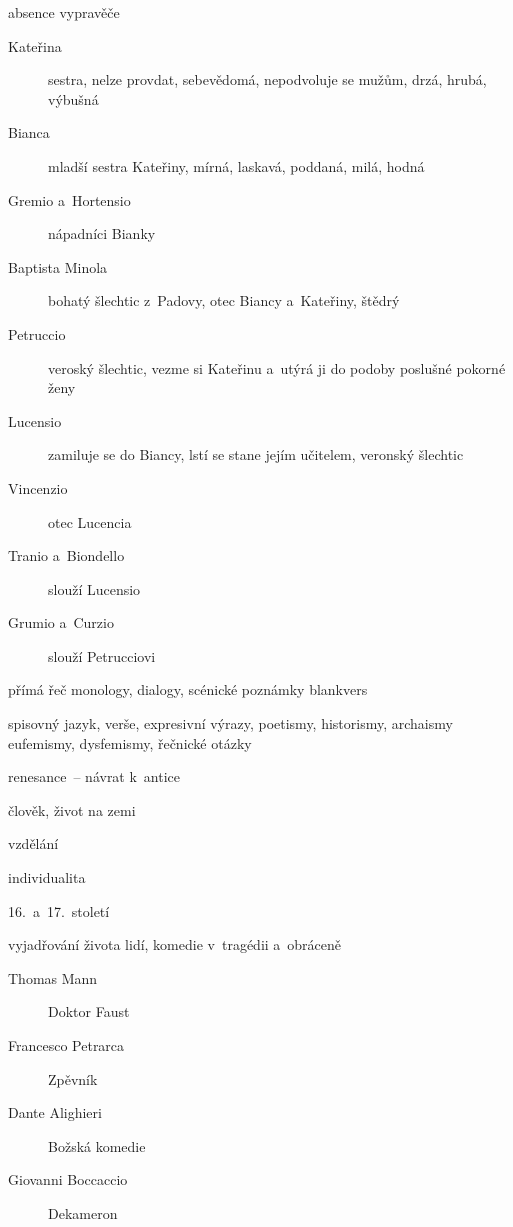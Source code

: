 {\newpart

absence vypravěče
\begin{description}
	\item[Kateřina] sestra, nelze provdat, sebevědomá, nepodvoluje se mužům, drzá, hrubá, výbušná
	\item[Bianca] mladší sestra Kateřiny, mírná, laskavá, poddaná, milá, hodná
	\item[Gremio a~Hortensio] nápadníci Bianky
	\item[Baptista Minola] bohatý šlechtic z~Padovy, otec Biancy a~Kateřiny, štědrý
	\item[Petruccio] veroský šlechtic, vezme si Kateřinu a~utýrá ji do podoby poslušné pokorné ženy
	\item[Lucensio] zamiluje se do Biancy, lstí se stane jejím učitelem, veronský šlechtic
	\item[Vincenzio] otec Lucencia
	\item[Tranio a~Biondello] slouží Lucensio
	\item[Grumio a~Curzio] slouží Petrucciovi
\end{description}

přímá řeč
monology, dialogy, scénické poznámky
blankvers

\newpart

spisovný jazyk, verše, expresivní výrazy, poetismy, historismy, archaismy
eufemismy, dysfemismy, řečnické otázky
\begin{compactitem}
	\item renesance~-- návrat k~antice
	\begin{compactitem}
		\item člověk, život na zemi
		\item vzdělání
		\item individualita
	\end{compactitem}
	\item 16.~a~17.~století
	\item vyjadřování života lidí, komedie v~tragédii a~obráceně
\end{compactitem}


\begin{description}
\item[Thomas Mann] Doktor Faust
\item[Francesco Petrarca] Zpěvník
\item[Dante Alighieri] Božská komedie
\item[Giovanni Boccaccio] Dekameron
\end{description}
}
